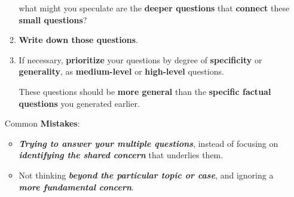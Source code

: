\documentclass[11pt]{article}
\begin{document}
\begin{itemize}
\begin{exercise}
\begin{enumerate}
what might you speculate are the \textbf{deeper questions} that \textbf{connect} these \textbf{small questions}?

\item \textbf{Write down those questions}.

\item If necessary, \textbf{prioritize} your questions by degree of \textbf{specificity} or \textbf{generality}, as \textbf{medium-level} or \textbf{high-level} questions. 

These questions should be \textbf{more general} than the \textbf{specific factual questions} you generated earlier.
\end{enumerate}
\end{exercise}
Common \textbf{Mistakes}:
\begin{itemize}
\item \textbf{\emph{Trying to answer your multiple questions}}, instead of focusing on \textbf{\emph{identifying the shared concern}} that underlies them. 

\item Not thinking \textbf{\emph{beyond the particular topic or case}}, and ignoring a \textbf{\emph{more fundamental concern}}.
\end{itemize}


\end{itemize}
\end{document}

